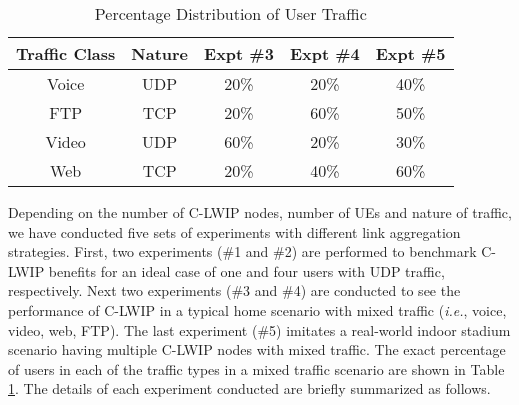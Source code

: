 \documentclass[conference]{IEEEtran}
\begin{document}
\begin{table}[htb!]
\centering
\caption{Percentage Distribution of User Traffic }
\renewcommand{\arraystretch}{1.2}
\begin{tabular}{|c|c|c|c|c|} \hline 
\label{tab:mixedtraffic}
\textbf{Traffic Class} & \textbf{Nature} & \textbf{Expt \#3} & \textbf{Expt \#4} & \textbf{Expt \#5}\\ [1ex]\hline \hline
Voice & UDP & 20\% & 20\% & 40\% \\ \hline
FTP & TCP & 20\% & 60\% & 50\% \\ \hline
Video & UDP & 60\% & 20\% & 30\% \\ \hline
Web & TCP & 20\% & 40\% & 60\% \\ \hline
\end{tabular}
\end{table}
Depending on the number of C-LWIP nodes, number of UEs and nature of traffic, we have conducted five sets of experiments with different link aggregation strategies. First, two experiments (\#1 and \#2) are performed to benchmark C-LWIP benefits for an ideal case of one and four users with UDP traffic, respectively. Next two experiments (\#3 and \#4) are conducted to see the performance of C-LWIP in a typical home scenario with mixed traffic (\emph{i.e.}, voice, video, web, FTP). The last experiment (\#5) imitates a real-world indoor stadium scenario having multiple C-LWIP nodes with mixed traffic. The exact percentage of users in each of the traffic types in a mixed traffic scenario are shown in Table \ref{tab:mixedtraffic}. The details of each experiment conducted are briefly summarized as follows. 
\end{document}
